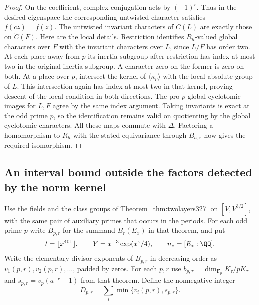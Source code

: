 \documentclass[a4paper,11pt]{article}
\theoremstyle{definition}
\theoremstyle{remark}
\numberwithin{equation}{section}
\begin{document}
\begin{proof}
On the coefficient, complex conjugation acts by \((-1)^r\).
Thus in the desired eigenspace the corresponding untwisted
character satisfies \(f(cz)=f(z)\). The untwisted invariant
characters of \(\widetilde C(L)\) are exactly those on
\(\widetilde C(F)\). Here are the local details. Restriction
identifies \(R_h\)-valued global characters over \(F\)
with the invariant characters over \(L\), since \(L/F\)
has order two. At each place away from \(p\) its inertia
subgroup after restriction has index at most two in the
original inertia subgroup. A character zero on the former
is zero on both. At a place over \(p\), intersect the
kernel of \(\langle\kappa_p\rangle\) with the local
absolute group of \(L\). This intersection again has
index at most two in that kernel, proving descent of the
local condition in both directions. The pro-\(p\) global
cyclotomic images for \(L,F\) agree by the same index
argument. Taking invariants is exact at the odd prime
\(p\), so the identification remains valid on quotienting
by the global cyclotomic characters. All these maps commute
with \(\Delta\). Factoring a homomorphism to \(R_h\) with
the stated equivariance through \(B_{h,r}\) now gives the
required isomorphism.
\end{proof}

\subsection{An interval bound outside the factors detected by the norm kernel}\label{nav:III-76}
Use the fields and the class groups of Theorem~\ref{thm:twolayers327}
on \([V,V^{3/2}]\), with the same pair of auxiliary primes that
occurs in the periods. For each odd prime \(p\) write \(B_{p,r}\)
for the summand \(B_r(E_x)\) in that theorem, and put
\[
 t=\lfloor x^{401}\rfloor,\qquad
 Y=x^{-3}\exp(x^\varepsilon/4),\qquad n_*=[E_*:\QQ].
\]
Write the elementary divisor exponents of \(B_{p,r}\) in decreasing
order as \(v_1(p,r),v_2(p,r),\ldots\), padded by zeros. For each
\(p,r\) use \(b_{p,\tau}=\dim_{\mathbf F_p}K_\tau/pK_\tau\)
and \(s_{p,r}=v_p(a^{-r}-1)\) from that theorem. Define the
nonnegative integer
\[
 D_{p,r}=\sum_i\min\{v_i(p,r),s_{p,r}\}.
\]
\end{document}
